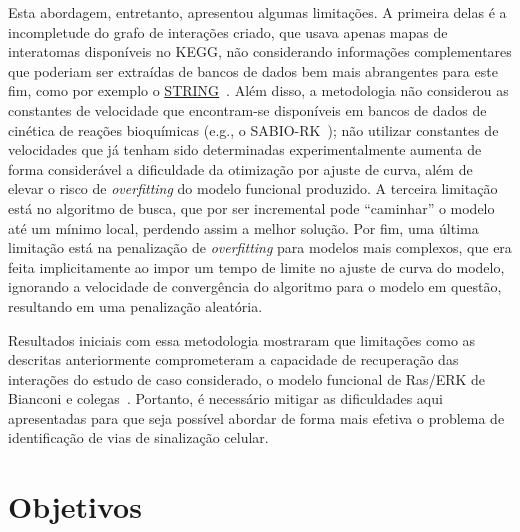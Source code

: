\documentclass[12pt]{article}
\begin{document}
Esta abordagem, entretanto, apresentou algumas limitações. A primeira delas é a incompletude do grafo de interações criado, que usava apenas mapas de interatomas disponíveis no KEGG, não considerando informações complementares que poderiam ser extraídas de bancos de dados bem mais abrangentes para este fim, como por exemplo o \href{https://string-db.org/}{STRING}~\cite{szklarczyk2010string}. Além disso, a metodologia não considerou as constantes de velocidade que encontram-se disponíveis em bancos de dados de cinética de reações bioquímicas (e.g., o SABIO-RK~\cite{doi:10.1093/nar/gkr1046}); não utilizar constantes de velocidades que já tenham sido determinadas experimentalmente aumenta de forma considerável a dificuldade da otimização por ajuste de curva, além de elevar o risco de {\em overfitting} do modelo funcional produzido. A terceira limitação está no algoritmo de busca, que por ser incremental pode ``caminhar'' o modelo até um mínimo local, perdendo assim a melhor solução. Por fim, uma última limitação está na penalização de {\em overfitting} para modelos mais complexos, que era feita implicitamente ao impor um tempo de limite no ajuste de curva do modelo, ignorando a velocidade de convergência do algoritmo para o modelo em questão, resultando em uma penalização aleatória.

Resultados iniciais com essa metodologia mostraram que limitações como as descritas anteriormente comprometeram a capacidade de recuperação das interações do estudo de caso considerado, o modelo funcional de Ras/ERK de Bianconi e colegas~\cite{Wu2015metodo,bianconi2012computational}. Portanto, é necessário mitigar as dificuldades aqui apresentadas para que seja possível abordar de forma mais efetiva o problema de identificação de vias de sinalização celular.


\section{Objetivos}
\end{document}
